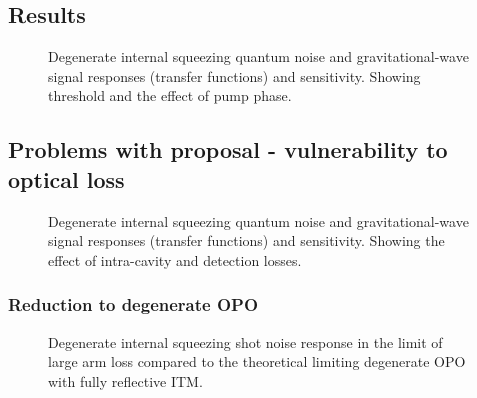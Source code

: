 



\subsection{Results}





\begin{figure}
	\centering
	\caption{Degenerate internal squeezing quantum noise and gravitational-wave signal responses (transfer functions) and sensitivity. Showing threshold and the effect of pump phase. }
	\label{fig:}
\end{figure}


\subsection{Problems with proposal - vulnerability to optical loss}

\begin{figure}
	\centering
	\caption{Degenerate internal squeezing quantum noise and gravitational-wave signal responses (transfer functions) and sensitivity. Showing the effect of intra-cavity and detection losses. }
	\label{fig:}
\end{figure}



\subsubsection{Reduction to degenerate OPO}

\begin{figure}
	\centering
	\caption{Degenerate internal squeezing shot noise response in the limit of large arm loss compared to the theoretical limiting degenerate OPO with fully reflective ITM.}
	\label{fig:}
\end{figure}



